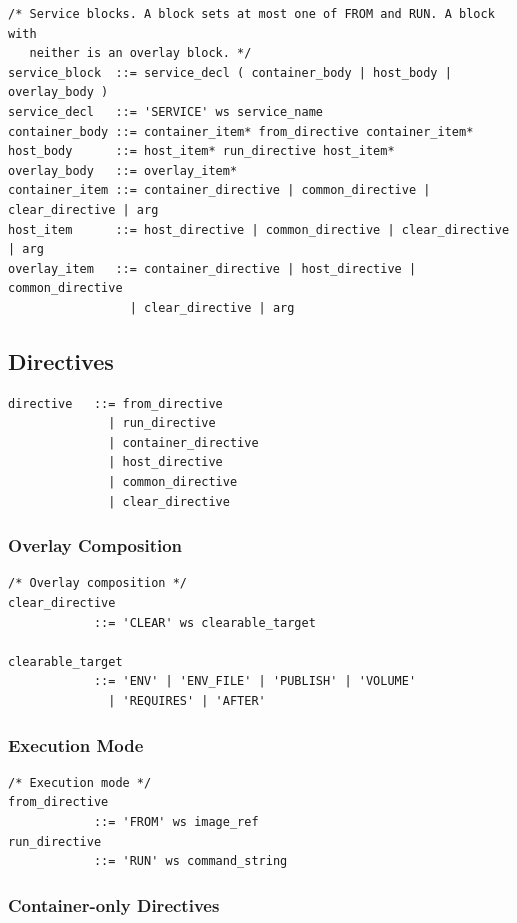 \documentclass[a4paper,11pt]{article}
\begin{document}
\begin{lstlisting}
/* Service blocks. A block sets at most one of FROM and RUN. A block with
   neither is an overlay block. */
service_block  ::= service_decl ( container_body | host_body | overlay_body )
service_decl   ::= 'SERVICE' ws service_name
container_body ::= container_item* from_directive container_item*
host_body      ::= host_item* run_directive host_item*
overlay_body   ::= overlay_item*
container_item ::= container_directive | common_directive | clear_directive | arg
host_item      ::= host_directive | common_directive | clear_directive | arg
overlay_item   ::= container_directive | host_directive | common_directive
                 | clear_directive | arg
\end{lstlisting}

\subsection{Directives}

\begin{lstlisting}
directive   ::= from_directive
              | run_directive
              | container_directive
              | host_directive
              | common_directive
              | clear_directive
\end{lstlisting}

\subsubsection{Overlay Composition}

\begin{lstlisting}
/* Overlay composition */
clear_directive
            ::= 'CLEAR' ws clearable_target

clearable_target
            ::= 'ENV' | 'ENV_FILE' | 'PUBLISH' | 'VOLUME'
              | 'REQUIRES' | 'AFTER'
\end{lstlisting}

\subsubsection{Execution Mode}

\begin{lstlisting}
/* Execution mode */
from_directive
            ::= 'FROM' ws image_ref
run_directive
            ::= 'RUN' ws command_string
\end{lstlisting}

\subsubsection{Container-only Directives}
\end{document}
